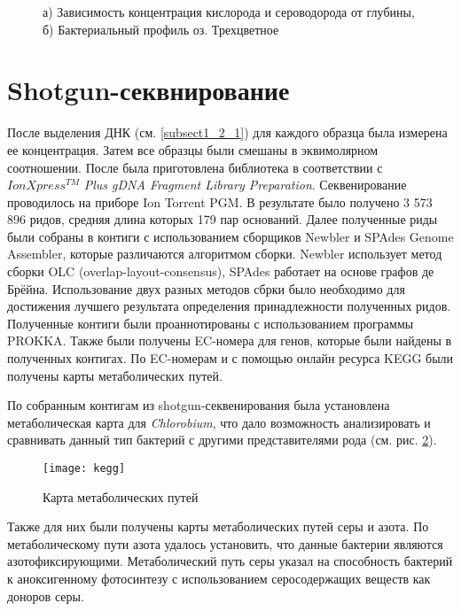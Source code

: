 \begin{figure}[h]
\begin{minipage}[h]{0.5\linewidth}
\end{minipage}
\hfill
\begin{minipage}[h]{0.5\linewidth}
\end{minipage}
\caption{а) Зависимость концентрация кислорода и сероводорода от глубины, б) Бактериальный профиль оз. Трехцветное}
\label{ris:concentr, 3cvet}
\end{figure}

\section{Shotgun-секвнирование}
После выделения ДНК (см. \ref{subsect1_2_1}) для каждого образца была измерена ее концентрация. Затем все образцы были смешаны в эквимолярном соотношении. После была приготовлена библиотека в соответствии с $IonXpress^{TM}$ \textit{Plus gDNA Fragment Library Preparation}. Секвенирование проводилось на приборе Ion Torrent PGM. В результате было получено 3 573 896 ридов, средняя длина которых 179 пар оснований. Далее полученные риды были собраны в контиги с использованием  сборщиков Newbler и SPAdes Genome Assembler, которые различаются алгоритмом сборки. Newbler использует метод сборки OLC (overlap-layout-consensus), SPAdes работает на основе графов де Брёйна. Использование двух разных методов сбрки было необходимо для достижения лучшего результата определения принадлежности полученных ридов. Полученные контиги были проаннотированы с использованием программы PROKKA. Также были получены EC-номера для генов, которые были найдены в полученных контигах. По EC-номерам и с помощью онлайн ресурса KEGG были получены карты метаболических путей. 

По собранным контигам из shotgun-секвенирования была установлена метаболическая карта для \textit{Chlorobium}, что дало возможность анализировать и сравнивать данный тип бактерий с другими представителями рода (см. рис. \ref{img:kegg}). 

\begin{figure}[h]
  \texttt{[image: kegg]}
  \centering
  \caption{Карта метаболических путей}
  \label{img:kegg}  
\end{figure}

Также для них были получены карты метаболических путей серы и азота. По метаболическому пути азота удалось установить, что данные бактерии являются азотофиксирующими. Метаболический путь серы указал на способность бактерий к аноксигенному фотосинтезу с использованием серосодержащих веществ как доноров серы. 

